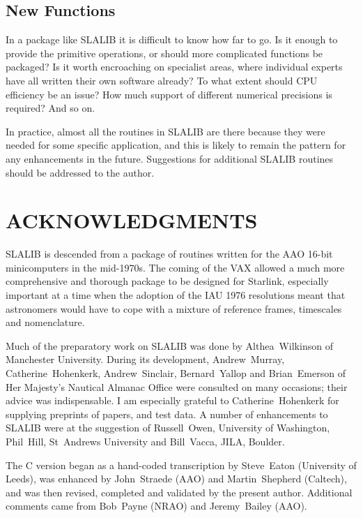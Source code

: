 \subsection{New Functions}
In a package like SLALIB it is difficult to know how far to go.  Is it
enough to provide the primitive operations, or should more
complicated functions be packaged?  Is it worth encroaching on
specialist areas, where individual experts have all written their
own software already?  To what extent should CPU efficiency be
an issue?  How
much support of different numerical precisions is required?  And
so on.

In practice, almost all the routines in SLALIB are there because they were
needed for some specific application, and this is likely to remain the
pattern for any enhancements in the future.
Suggestions for additional SLALIB routines should be addressed to the
author.

\section{ACKNOWLEDGMENTS}

SLALIB is descended from a package of routines written
for the AAO 16-bit minicomputers
in the mid-1970s.  The coming of the VAX
allowed a much more comprehensive and thorough package
to be designed for Starlink, especially important
at a time when the adoption
of the IAU 1976 resolutions meant that astronomers
would have to cope with a mixture of reference frames,
timescales and nomenclature.

Much of the preparatory work on SLALIB was done by Althea~Wilkinson of
Manchester University.  During its development,
Andrew~Murray, Catherine~Hohenkerk, Andrew~Sinclair, Bernard~Yallop
and Brian~Emerson of Her Majesty's Nautical Almanac Office were consulted
on many occasions; their advice was indispensable.
I am especially grateful to Catherine~Hohenkerk for supplying preprints of
papers, and test data.
A number of enhancements to SLALIB
were at the suggestion of
Russell~Owen, University of Washington,
Phil~Hill, St~Andrews University and
Bill~Vacca, JILA, Boulder.

The C version began as a hand-coded transcription
by Steve~Eaton (University of Leeds), was enhanced by John~Straede (AAO)
and Martin~Shepherd (Caltech), and was then revised, completed
and validated by the present author.  Additional comments came from
Bob~Payne (NRAO) and
Jeremy~Bailey (AAO).

\pagebreak

